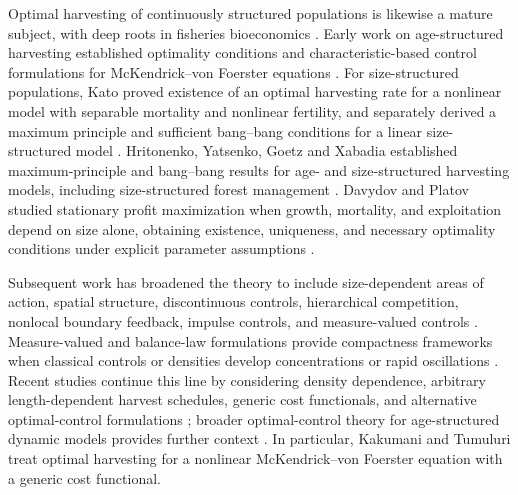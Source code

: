 \documentclass[pdflatex,sn-mathphys-num]{sn-jnl}
\theoremstyle{plain}
\theoremstyle{definition}
\theoremstyle{remark}
\begin{document}
Optimal harvesting of continuously structured populations is likewise a mature
subject, with deep roots in fisheries bioeconomics
\cite{beverton2012dynamics,clark2010mathematical,opmeer2025optimal}. Early work on age-structured
harvesting established optimality conditions and characteristic-based control
formulations for McKendrick--von Foerster equations
\cite{gurtin1981optimal,murphy1990optimal,liu2025bidirectional,brokate1985pontryagin,
anita2013analysis,barbu1999optimal,feichtinger2003optimality,pontryagin2018mathematical}.
For size-structured populations, Kato proved existence of an optimal harvesting
rate for a nonlinear model with separable mortality and nonlinear fertility, and
separately derived a maximum principle and sufficient bang--bang conditions for a
linear size-structured model \cite{kato2008maximum,kato2008optimal}. Hritonenko, Yatsenko,
Goetz and Xabadia established maximum-principle and bang--bang results for
age- and size-structured harvesting models, including size-structured forest
management \cite{hritonenko2009bang}. Davydov and Platov studied stationary
profit maximization when growth, mortality, and exploitation depend on size
alone, obtaining existence, uniqueness, and necessary optimality conditions under
explicit parameter assumptions \cite{davydov2011optimization}.

Subsequent work has broadened the theory to include size-dependent areas of
action, spatial structure, discontinuous controls, hierarchical competition,
nonlocal boundary feedback, impulse controls, and measure-valued controls
\cite{anita2019optimal,anicta2019optimal,liang2025global,
hritonenko2012bang,coclite2017time,calsina1995model,wang2026damage,
cushing1994structured}. Measure-valued and balance-law formulations provide compactness
frameworks when classical controls or densities develop concentrations or rapid
oscillations \cite{bressan2013multidimensional,yu2026pattern,coclite2017time,
carrillo2012structured,debiec2018relative,wang2026algebraic}. Recent studies continue this line by
considering density dependence, arbitrary length-dependent harvest schedules,
generic cost functionals, and alternative optimal-control formulations
\cite{opmeer2025optimal,kakumani2026optimal}; broader optimal-control theory for
age-structured dynamic models provides further context
\cite{freiberger2025optimization,kang2024dynamical,khan2022optimal,wu2025age,chen2025numerical,wang2023global}. In particular, Kakumani and Tumuluri
\cite{kakumani2026optimal} treat optimal harvesting for a nonlinear
McKendrick--von Foerster equation with a generic cost functional.
\end{document}
